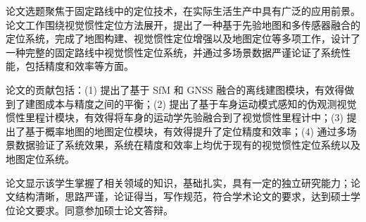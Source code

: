 
\begin{comments}

论文选题聚焦于固定路线中的定位技术，在实际生活生产中具有广泛的应用前景。论文工作围绕视觉惯性定位方法展开，提出了一种基于先验地图和多传感器融合的定位系统，完成了地图构建、视觉惯性定位增强以及地图定位等多项工作，设计了一种完整的固定路线中视觉惯性定位系统，并通过多场景数据严谨论证了系统性能，包括精度和效率等方面。

论文的贡献包括：(1) 提出了基于 SfM 和 GNSS 融合的离线建图模块，有效得做到了建图成本与精度之间的平衡；(2) 提出了基于车身运动模式感知的伪观测视觉惯性里程计模块，有效得将车身的运动学先验融合到了视觉惯性里程计中；(3) 提出了基于概率地图的地图定位模块，有效得提升了定位精度和效率；(4) 通过多场景数据验证了系统效果，系统在精度和效率上均优于现有的视觉惯性定位系统以及地图定位系统。

论文显示该学生掌握了相关领域的知识，基础扎实，具有一定的独立研究能力；论文结构清晰，思路严谨，论证得当，写作规范，符合学术论文的要求，达到硕士学位论文要求。同意参加硕士论文答辩。

\end{comments}
